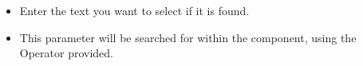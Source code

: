 \begin{itemize}
\item Enter the text you want to select if it is found.
\item This parameter will be searched for within the component, using the Operator provided.
\end{itemize}
